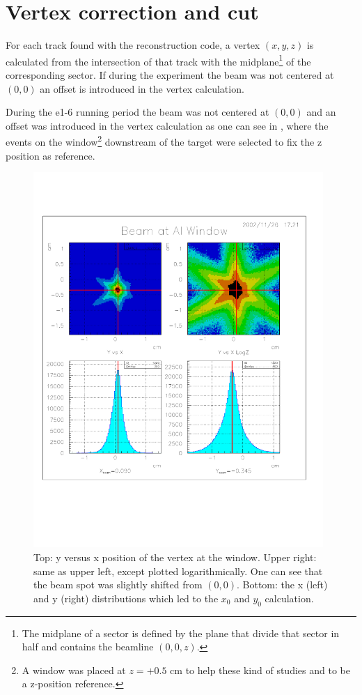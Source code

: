 \cia
\vspace{-2.5cm}
\section{Vertex correction and cut} 
\label{sec:vertexcorr}
For each track found with the reconstruction code, a vertex $(x,y,z)$ is calculated
from the intersection of that track with the midplane\footnote{The midplane 
of a sector is defined by the plane that divide that sector in half and contains the beamline $(0,0,z)$.}  
of the corresponding sector.
If during the experiment the beam was not centered at $(0,0)$ an offset is introduced 
in the vertex calculation.

During the e1-6 running period  
the beam was not centered at $(0,0)$ and an  offset was introduced
in the vertex calculation as 
one can see in , where the events on the window\footnote{A window was placed at $z=+0.5$ cm
to help these kind of studies and to be a z-position reference.}
downstream of the target were selected to fix the z position as reference.

\begin{figure}[h]
 \begin{center}
  \includegraphics[width=11cm, bb=0 120 680 720]{data_reduction/img/vertex_id}
  \caption[ x and y position of the vertex at the window]
          {  Top: y versus x position of the vertex at the window. Upper right: same as upper left, 
	              except plotted logarithmically.
	              One can see that the beam spot
                      was slightly shifted from $(0,0)$. Bottom: the x (left) and y (right) 
		      distributions which led to the $x_0$ and $y_0$ calculation. }
 \label{fig:vertex_id}
 \end{center}
\end{figure}


